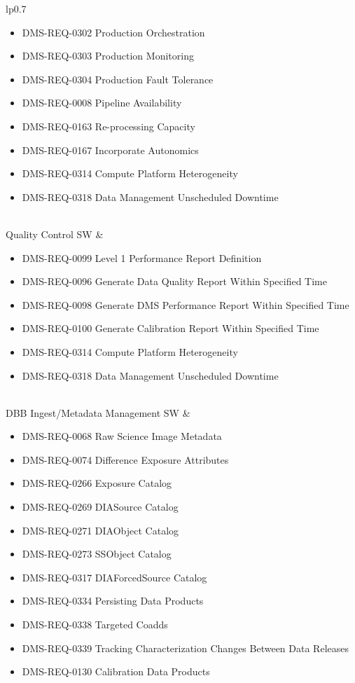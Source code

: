\begin{xtabular}{lp{0.7\textwidth}}
\begin{itemize}
\item DMS-REQ-0302 Production Orchestration
\item DMS-REQ-0303 Production Monitoring
\item DMS-REQ-0304 Production Fault Tolerance
\item DMS-REQ-0008 Pipeline Availability
\item DMS-REQ-0163 Re-processing Capacity
\item DMS-REQ-0167 Incorporate Autonomics
\item DMS-REQ-0314 Compute Platform Heterogeneity
\item DMS-REQ-0318 Data Management Unscheduled Downtime
\end{itemize} \\ \hline
Quality Control SW &
\begin{itemize}DMS-REQ-0097 Level 1 Data Quality Report Definition
\item DMS-REQ-0099 Level 1 Performance Report Definition
\item DMS-REQ-0096 Generate Data Quality Report Within Specified Time
\item DMS-REQ-0098 Generate DMS Performance Report Within Specified Time
\item DMS-REQ-0100 Generate Calibration Report Within Specified Time
\item DMS-REQ-0314 Compute Platform Heterogeneity
\item DMS-REQ-0318 Data Management Unscheduled Downtime
\end{itemize} \\ \hline
DBB Ingest/Metadata Management SW &
\begin{itemize}DMS-REQ-0346 Data Availability
\item DMS-REQ-0068 Raw Science Image Metadata
\item DMS-REQ-0074 Difference Exposure Attributes
\item DMS-REQ-0266 Exposure Catalog
\item DMS-REQ-0269 DIASource Catalog
\item DMS-REQ-0271 DIAObject Catalog
\item DMS-REQ-0273 SSObject Catalog
\item DMS-REQ-0317 DIAForcedSource Catalog
\item DMS-REQ-0334 Persisting Data Products
\item DMS-REQ-0338 Targeted Coadds
\item DMS-REQ-0339 Tracking Characterization Changes Between Data Releases
\item DMS-REQ-0130 Calibration Data Products

\end{itemize}
\end{xtabular}
